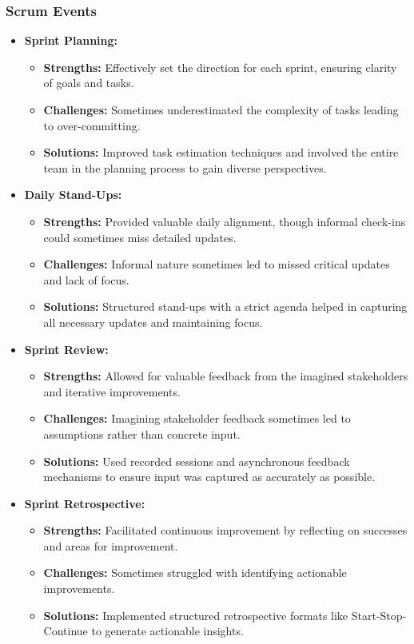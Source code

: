 \documentclass[11pt,a4paper]{article}
\begin{document}
    \subsubsection{Scrum Events}\label{subsubsec:scrum-events}
    \begin{itemize}
        \item \textbf{Sprint Planning:}
        \begin{itemize}
            \item \textbf{Strengths:} Effectively set the direction for each sprint, ensuring clarity of goals and tasks.
            \item \textbf{Challenges:} Sometimes underestimated the complexity of tasks leading to over-committing.
            \item \textbf{Solutions:} Improved task estimation techniques and involved the entire team in the planning process to gain diverse perspectives.
        \end{itemize}
        \item \textbf{Daily Stand-Ups:}
        \begin{itemize}
            \item \textbf{Strengths:} Provided valuable daily alignment, though informal check-ins could sometimes miss detailed updates.
            \item \textbf{Challenges:} Informal nature sometimes led to missed critical updates and lack of focus.
            \item \textbf{Solutions:} Structured stand-ups with a strict agenda helped in capturing all necessary updates and maintaining focus.
        \end{itemize}
        \item \textbf{Sprint Review:}
        \begin{itemize}
            \item \textbf{Strengths:} Allowed for valuable feedback from the imagined stakeholders and iterative improvements.
            \item \textbf{Challenges:} Imagining stakeholder feedback sometimes led to assumptions rather than concrete input.
            \item \textbf{Solutions:} Used recorded sessions and asynchronous feedback mechanisms to ensure input was captured as accurately as possible.
        \end{itemize}
        \item \textbf{Sprint Retrospective:}
        \begin{itemize}
            \item \textbf{Strengths:} Facilitated continuous improvement by reflecting on successes and areas for improvement.
            \item \textbf{Challenges:} Sometimes struggled with identifying actionable improvements.
            \item \textbf{Solutions:} Implemented structured retrospective formats like Start-Stop-Continue to generate actionable insights.
        \end{itemize}
    \end{itemize}
\end{document}
